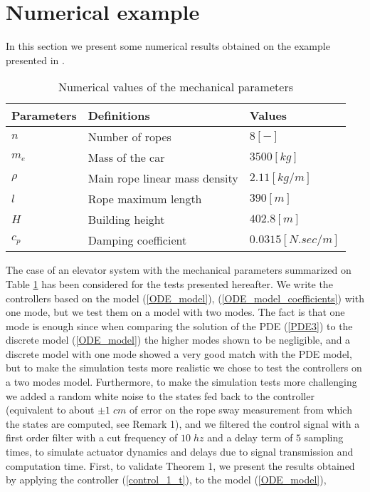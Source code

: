 \documentclass[letterpaper, 11 pt, conference]{ieeeconf}
\begin{document}
\section{Numerical example}\label{section3}
In this section we present some numerical results obtained on the
example presented in \cite{K011}.
\begin{table}\hspace*{-0.5cm}
\begin{center}
\begin{tabular}{|l|l|l|}
\hline {\bf Parameters} & {\bf Definitions} & {\bf Values}\\\hline
$n$ & Number of ropes &$ 8[-]$\\
$m_{e}$ & Mass of the car & $3500 [kg]$\\
$\rho$ & Main rope linear mass density & $2.11[kg/m]$\\
$l$ & Rope maximum length & $390[m]$\\
$H$ & Building height & $402.8[m]$\\
$c_{p}$ & Damping coefficient & $0.0315 [N.sec/m]$\\
\hline
\end{tabular}\caption{Numerical values of the mechanical parameters}
\label{table1}
\end{center}
\end{table}
The case of an elevator system with the mechanical parameters
summarized on Table \ref{table1} has been considered for the tests
presented hereafter. We write the controllers based on the model
(\ref{ODE_model}), (\ref{ODE_model_coefficients}) with one mode,
but we test them on a model with two modes. The fact is that one
mode is enough since when comparing the solution of the PDE
(\ref{PDE3}) to the discrete model (\ref{ODE_model}) the higher
modes shown to be negligible, and a discrete model with one mode
showed a very good match with the PDE model, but to make the
simulation tests more realistic we chose to test the controllers
on a two modes model. Furthermore, to make the simulation tests
more challenging we added a random white noise to the states fed
back to the controller (equivalent to about $\pm1\;cm$ of error on
the rope sway measurement from which the states are computed, see
Remark 1), and we filtered the control signal with a first order
filter with a cut frequency of $10\;hz$ and a delay term of $5$
sampling times, to simulate actuator dynamics and delays due to
signal transmission and computation time. First, to validate
Theorem 1, we present the results obtained by applying the
controller (\ref{control_1_t}), to the model (\ref{ODE_model}),
\end{document}
